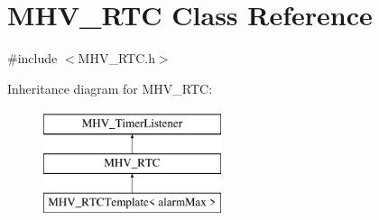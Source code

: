 \hypertarget{class_m_h_v___r_t_c}{
\section{\-M\-H\-V\-\_\-\-R\-T\-C \-Class \-Reference}
\label{class_m_h_v___r_t_c}
}


{\ttfamily \#include $<$\-M\-H\-V\-\_\-\-R\-T\-C.\-h$>$}

\-Inheritance diagram for \-M\-H\-V\-\_\-\-R\-T\-C\-:\begin{figure}[H]
\begin{center}
\leavevmode
\includegraphics[height=3.000000cm]{class_m_h_v___r_t_c}
\end{center}
\end{figure}
